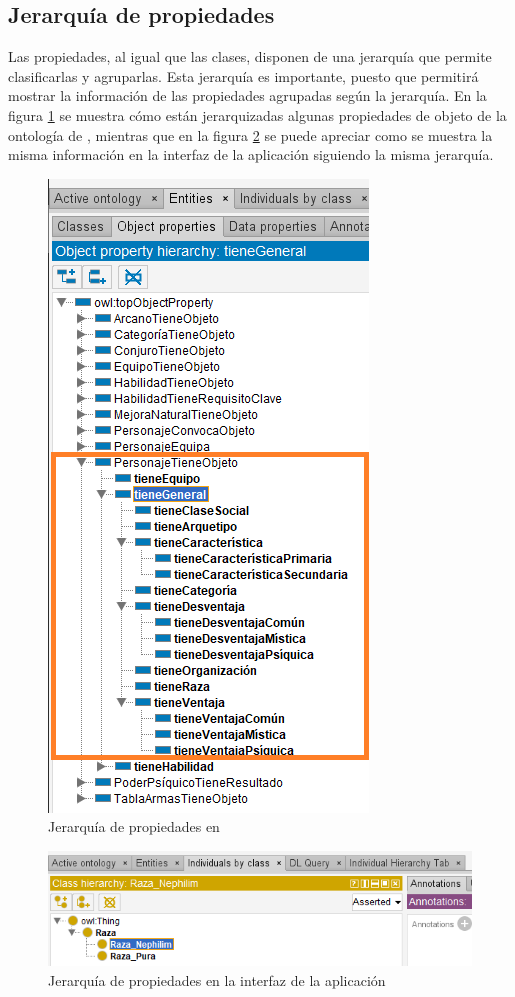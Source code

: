 \subsection{Jerarquía de propiedades}
Las propiedades, al igual que las clases, disponen de una jerarquía que permite clasificarlas y agruparlas. Esta jerarquía es importante, 
puesto que permitirá mostrar la información de las propiedades agrupadas según la jerarquía. En la figura \ref*{Jerarquia_1} se muestra 
cómo están jerarquizadas algunas propiedades de objeto de la ontología de \anima, mientras que en la figura \ref*{Jerarquia_2} se puede 
apreciar como se muestra la misma información en la interfaz de la aplicación siguiendo la misma jerarquía.
\newpage
\begin{figure}[H]
    \centering
    \includegraphics[scale=0.6]{Figures/Protege/Jerarquia_1.png}
    \caption{Jerarquía de propiedades en \protege}
    \label{Jerarquia_1}
\end{figure}

\begin{figure}[H]
    \centering
    \includegraphics[scale=0.6]{Figures/Protege/CreateIndividual_1.png}
    \caption{Jerarquía de propiedades en la interfaz de la aplicación}
    \label{Jerarquia_2}
\end{figure}

